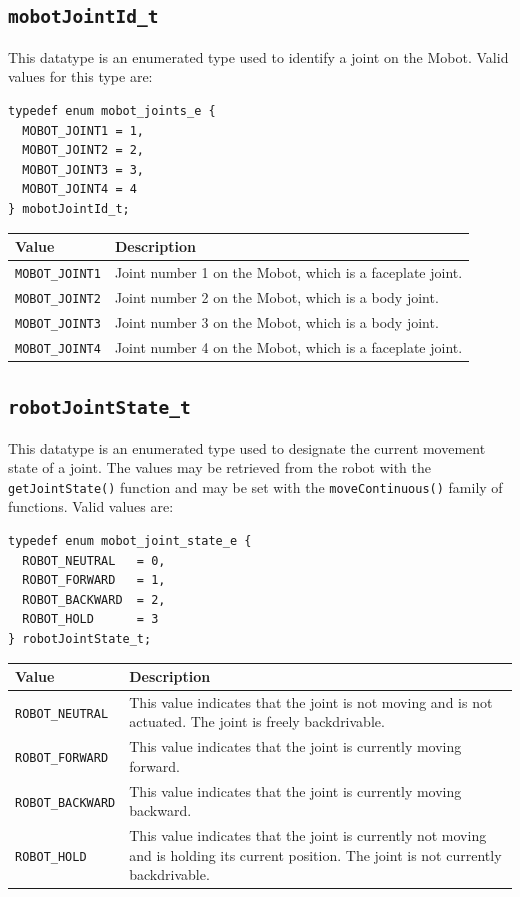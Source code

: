 \documentclass{article}
\begin{document}
\subsection{\label{sec:mobotJointId_t}\texttt{mobotJointId\_t}}
This datatype is an enumerated type used to identify a joint on the Mobot. Valid
values for this type are:
\begin{verbatim}
typedef enum mobot_joints_e {
  MOBOT_JOINT1 = 1,
  MOBOT_JOINT2 = 2,
  MOBOT_JOINT3 = 3,
  MOBOT_JOINT4 = 4
} mobotJointId_t;
\end{verbatim}

\begin{tabular}{p{3cm}p{10cm}} \hline 
Value & Description \\
\hline 
\texttt{MOBOT\_JOINT1} & Joint number 1 on the Mobot, which is a faceplate joint. \\
\texttt{MOBOT\_JOINT2} & Joint number 2 on the Mobot, which is a body joint. \\
\texttt{MOBOT\_JOINT3} & Joint number 3 on the Mobot, which is a body joint. \\
\texttt{MOBOT\_JOINT4} & Joint number 4 on the Mobot, which is a faceplate joint. \\
\hline
\end{tabular}

\subsection{\label{sec:robotJointState_t}\texttt{robotJointState\_t}}
This datatype is an enumerated type used to designate the current 
movement state of a joint. The values may be retrieved from the 
robot with the \texttt{getJointState()} function and may be set 
with the \texttt{moveContinuous()} family of functions. Valid values are:

\begin{verbatim}
typedef enum mobot_joint_state_e {
  ROBOT_NEUTRAL   = 0,
  ROBOT_FORWARD   = 1,
  ROBOT_BACKWARD  = 2,
  ROBOT_HOLD      = 3
} robotJointState_t;
\end{verbatim}

\begin{tabular}{p{3.3cm}p{11.5cm}} \hline 
Value & Description \\
\hline
\texttt{ROBOT\_NEUTRAL}& This value indicates that the joint is not moving and is not actuated. The joint is freely backdrivable. \\
\texttt{ROBOT\_FORWARD}& This value indicates that the joint is currently moving forward. \\
\texttt{ROBOT\_BACKWARD}& This value indicates that the joint is currently moving backward. \\
\texttt{ROBOT\_HOLD}& This value indicates that the joint is currently not moving and is holding its current position. The joint is not currently backdrivable. \\
\hline
\end{tabular}
\end{document}

